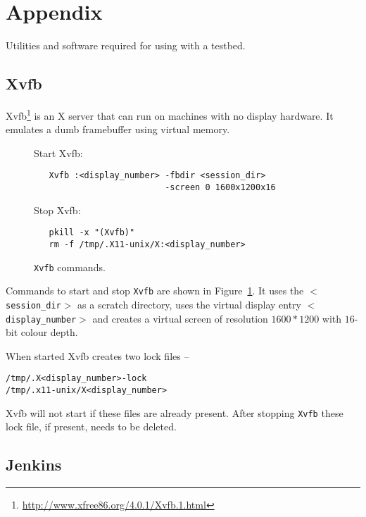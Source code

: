 

\appendix

\section{Appendix}
\label{sec:appendix}

Utilities and software required for using \mddozen{} with a testbed.

\subsection{Xvfb}

Xvfb\footnote{\url{http://www.xfree86.org/4.0.1/Xvfb.1.html}} is an X server that can run on machines with no display hardware. It emulates a dumb framebuffer using virtual memory.

\begin{figure}

   \scriptsize{
   \noindent Start Xvfb:\\
   \begin{lstlisting}
   Xvfb :<display_number> -fbdir <session_dir>
                          -screen 0 1600x1200x16
   \end{lstlisting}
   }

   \noindent Stop Xvfb:\\

   \scriptsize{
   \begin{lstlisting}
   pkill -x "(Xvfb)"
   rm -f /tmp/.X11-unix/X:<display_number>
   \end{lstlisting}
   }
   \caption{\texttt{Xvfb} commands.}
   \label{fig:xvfb}
\end{figure}

Commands to start and stop \texttt{Xvfb} are shown in Figure~\ref{fig:xvfb}. It uses the \texttt{$<$session\_dir$>$} as a scratch directory, uses the virtual display entry \texttt{$<$display\_number$>$} and creates a virtual screen of resolution $1600*1200$ with $16$-bit colour depth.

When started Xvfb creates two lock files --
\begin{lstlisting}
/tmp/.X<display_number>-lock
/tmp/.x11-unix/X<display_number>
\end{lstlisting}
Xvfb will not start if these files are already present. After stopping \texttt{Xvfb} these lock file, if present, needs to be deleted.


\subsection{Jenkins}

